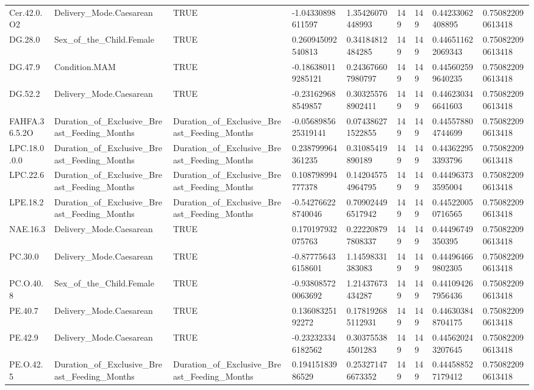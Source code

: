 \begin{longtable}{lllllllll}
Cer.42.0.O2 & Delivery\_Mode.Caesarean & TRUE & -1.04330898611597 & 1.35426070448993 & 149 & 149 & 0.44233062408895 & 0.750822090613418 \\
DG.28.0 & Sex\_of\_the\_Child.Female & TRUE & 0.260945092540813 & 0.34184812484285 & 149 & 149 & 0.446511622069343 & 0.750822090613418 \\
DG.47.9 & Condition.MAM & TRUE & -0.186380119285121 & 0.243676607980797 & 149 & 149 & 0.445602599640235 & 0.750822090613418 \\
DG.52.2 & Delivery\_Mode.Caesarean & TRUE & -0.231629688549857 & 0.303255768902411 & 149 & 149 & 0.446230346641603 & 0.750822090613418 \\
FAHFA.36.5.2O & Duration\_of\_Exclusive\_Breast\_Feeding\_Months & Duration\_of\_Exclusive\_Breast\_Feeding\_Months & -0.0568985625319141 & 0.074386271522855 & 149 & 149 & 0.445578804744699 & 0.750822090613418 \\
LPC.18.0.0.0 & Duration\_of\_Exclusive\_Breast\_Feeding\_Months & Duration\_of\_Exclusive\_Breast\_Feeding\_Months & 0.238799964361235 & 0.31085419890189 & 149 & 149 & 0.443622953393796 & 0.750822090613418 \\
LPC.22.6 & Duration\_of\_Exclusive\_Breast\_Feeding\_Months & Duration\_of\_Exclusive\_Breast\_Feeding\_Months & 0.108798994777378 & 0.142045754964795 & 149 & 149 & 0.444963733595004 & 0.750822090613418 \\
LPE.18.2 & Duration\_of\_Exclusive\_Breast\_Feeding\_Months & Duration\_of\_Exclusive\_Breast\_Feeding\_Months & -0.542766228740046 & 0.709024496517942 & 149 & 149 & 0.445220050716565 & 0.750822090613418 \\
NAE.16.3 & Delivery\_Mode.Caesarean & TRUE & 0.170197932075763 & 0.222208797808337 & 149 & 149 & 0.44496749350395 & 0.750822090613418 \\
PC.30.0 & Delivery\_Mode.Caesarean & TRUE & -0.877756436158601 & 1.14598331383083 & 149 & 149 & 0.444964669802305 & 0.750822090613418 \\
PC.O.40.8 & Sex\_of\_the\_Child.Female & TRUE & -0.938085720063692 & 1.21437673434287 & 149 & 149 & 0.441094267956436 & 0.750822090613418 \\
PE.40.7 & Delivery\_Mode.Caesarean & TRUE & 0.13608325192272 & 0.178192685112931 & 149 & 149 & 0.446303848704175 & 0.750822090613418 \\
PE.42.9 & Delivery\_Mode.Caesarean & TRUE & -0.232323346182562 & 0.303755384501283 & 149 & 149 & 0.445620243207645 & 0.750822090613418 \\
PE.O.42.5 & Duration\_of\_Exclusive\_Breast\_Feeding\_Months & Duration\_of\_Exclusive\_Breast\_Feeding\_Months & 0.19415183986529 & 0.253271476673352 & 149 & 149 & 0.444588527179412 & 0.750822090613418 \\

\end{longtable}
